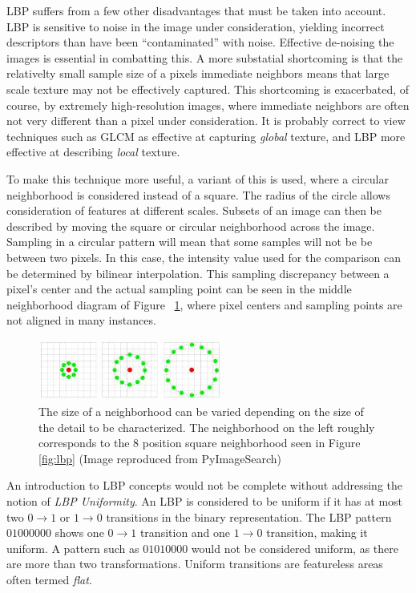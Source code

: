 \documentclass[letterpaper]{article}
\begin{document}
{LBP suffers from a few other disadvantages that must be taken into account. LBP is sensitive to noise in the image under consideration, yielding incorrect descriptors than have been ``contaminated'' with noise. Effective de-noising the images is essential in combatting this. A more substatial shortcoming is that the relativelty small sample size of a pixels immediate neighbors means that large scale texture may not be effectively captured. This shortcoming is exacerbated, of course, by extremely high-resolution images, where immediate neighbors are often not very different than a pixel under consideration. It is probably correct to view techniques such as GLCM as effective at capturing \textit{global} texture, and LBP more effective at describing \textit{local} texture.

To make this technique more useful, a variant of this is used, where a circular neighborhood is considered instead of a square. The radius of the circle allows consideration of features at different scales.  Subsets of an image can then be described by moving the square or circular neighborhood across the image.  Sampling in a circular pattern will mean that some samples will not be be between two pixels. In this case, the intensity value used for the comparison can be determined by bilinear interpolation. This sampling discrepancy between a pixel's center and the actual sampling point can be seen in the middle neighborhood diagram of Figure ~\ref{fig:lbp-circular}, where pixel centers and sampling points are not aligned in many instances.

\begin{figure}[H]
	\centering
	\includegraphics[height=2cm]{./figures/lbp_circular.jpg}	
	\caption[Local Binary Pattern circular neighborhoods]{The size of a neighborhood can be varied depending on the size of the detail to be characterized. The neighborhood on the left roughly corresponds to the 8 position square neighborhood seen in Figure \ref{fig:lbp} (Image reproduced from PyImageSearch)}
	\label{fig:lbp-circular}
\end{figure}

An introduction to LBP concepts would not be complete without addressing the notion of \textit{LBP Uniformity}. An LBP is considered to be uniform if it has at most two $0 \rightarrow 1$ or $1 \rightarrow 0$ transitions in the binary representation. The LBP pattern $01000000$ shows one $0 \rightarrow 1$ transition and one $1 \rightarrow 0$ transition, making it uniform. A pattern such as $01010000$ would not be considered uniform, as there are more than two transformations. Uniform transitions are featureless areas often termed \textit{flat}.

}
\end{document}
